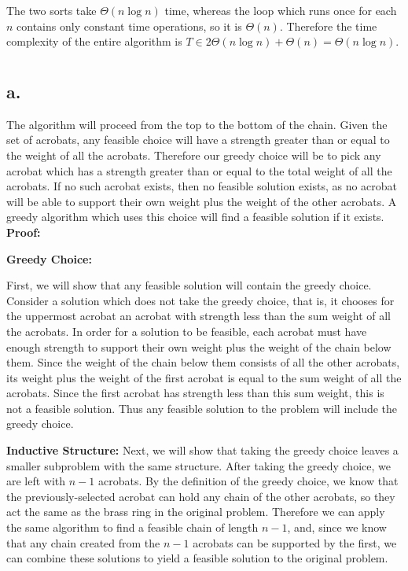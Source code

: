\documentclass[11pt]{article}
\begin{document}
The two sorts take $\Theta(n \log n)$ time, whereas the loop which runs once for each $n$ contains only constant time operations, so it is $\Theta(n)$. Therefore the time complexity of the entire algorithm is $T \in 2\Theta(n \log n) + \Theta(n) = \Theta(n \log n)$.



\section{}
\subsection*{a.}
The algorithm will proceed from the top to the bottom of the chain. Given the set of acrobats, any feasible choice will have a strength greater than or equal to the weight of all the acrobats. Therefore our greedy choice will be to pick any acrobat which has a strength greater than or equal to the total weight of all the acrobats. If no such acrobat exists, then no feasible solution exists, as no acrobat will be able to support their own weight plus the weight of the other acrobats. A greedy algorithm which uses this choice will find a feasible solution if it exists. \\ 

\textbf{Proof: }

\textbf{Greedy Choice: }

First, we will show that any feasible solution will contain the greedy choice. Consider a solution which does not take the greedy choice, that is, it chooses for the uppermost acrobat an acrobat with strength less than the sum weight of all the acrobats. In order for a solution to be feasible, each acrobat must have enough strength to support their own weight plus the weight of the chain below them. Since the weight of the chain below them consists of all the other acrobats, its weight plus the weight of the first acrobat is equal to the sum weight of all the acrobats. Since the first acrobat has strength less than this sum weight, this is not a feasible solution. Thus any feasible solution to the problem will include the greedy choice. 


\textbf{Inductive Structure: }
Next, we will show that taking the greedy choice leaves a smaller subproblem with the same structure. After taking the greedy choice, we are left with $n-1$ acrobats. By the definition of the greedy choice, we know that the previously-selected acrobat can hold any chain of the other acrobats, so they act the same as the brass ring in the original problem. Therefore we can apply the same algorithm to find a feasible chain of length $n-1$, and, since we know that any chain created from the $n-1$ acrobats can be supported by the first, we can combine these solutions to yield a feasible solution to the original problem.
\end{document}
